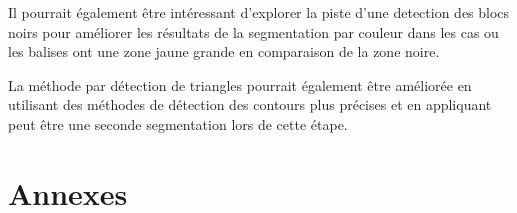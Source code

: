 \documentclass{article}
\begin{document}
Il pourrait également être intéressant d'explorer la piste d'une detection des
blocs noirs pour améliorer les résultats de la segmentation par couleur dans
les cas ou les balises ont une zone jaune grande en comparaison de la zone
noire.

La méthode par détection de triangles pourrait également être améliorée en
utilisant des méthodes de détection des contours plus précises et en appliquant
peut être une seconde segmentation lors de cette étape.

\newpage
\section{Annexes}

\begin{table}[h!]
    \centering
\end{table}
\end{document}
